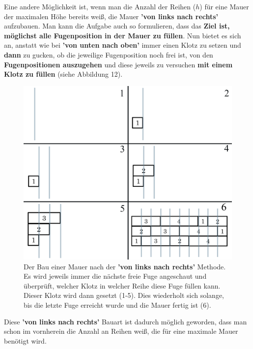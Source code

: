 \documentclass[a4paper,12pt]{article}
\begin{document}
Eine andere Möglichkeit ist, wenn man die Anzahl der Reihen ($h$) für eine Mauer der maximalen Höhe bereits weiß, die Mauer \textbf{'von links nach rechts'} aufzubauen.
Man kann die Aufgabe auch so formulieren, dass das \textbf{Ziel ist, möglichst alle Fugenposition in der Mauer zu füllen}. Nun bietet es sich an, anstatt wie bei \textbf{'von unten nach oben'} immer einen Klotz zu setzen und \textbf{dann} zu gucken, ob die jeweilige Fugenposition noch frei ist, von den \textbf{Fugenpositionen auszugehen} und diese jeweils zu versuchen \textbf{mit einem Klotz zu füllen} (siehe Abbildung 12).
\begin{figure}[H]
    \centering
    \includegraphics[width=1\linewidth]{Bilder/Aufgabe1/Definition_Mauerbauart_02.png}
    \caption{Der Bau einer Mauer nach der \textbf{'von links nach rechts'} Methode. Es wird jeweils immer die nächste freie Fuge angeschaut und überprüft, welcher Klotz in welcher Reihe diese Fuge füllen kann. Dieser Klotz wird dann gesetzt (1-5). Dies wiederholt sich solange, bis die letzte Fuge erreicht wurde und die Mauer fertig ist (6).}
\end{figure}

Diese \textbf{'von links nach rechts'} Bauart ist dadurch möglich geworden, dass man schon im vornherein die Anzahl an Reihen weiß, die für eine maximale Mauer benötigt wird.
\end{document}
